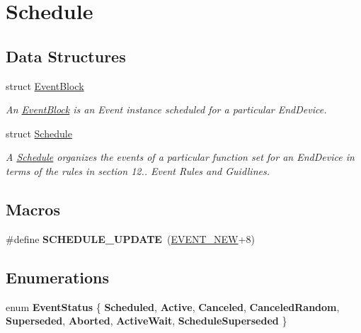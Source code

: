 \hypertarget{group__schedule}{}\section{Schedule}
\label{group__schedule}
\subsection*{Data Structures}
\begin{DoxyCompactItemize}
\item 
struct \hyperlink{structEventBlock}{Event\+Block}
\begin{DoxyCompactList}\small\item\em An \hyperlink{structEventBlock}{Event\+Block} is an Event instance scheduled for a particular End\+Device. \end{DoxyCompactList}\item 
struct \hyperlink{structSchedule}{Schedule}
\begin{DoxyCompactList}\small\item\em A \hyperlink{structSchedule}{Schedule} organizes the events of a particular function set for an End\+Device in terms of the rules in section 12.. Event Rules and Guidlines. \end{DoxyCompactList}\end{DoxyCompactItemize}
\subsection*{Macros}
\begin{DoxyCompactItemize}
\item 
\mbox{\label{group__schedule_ga78a859df05d86016268b99c2d6bbb5ed}} 
\#define {\bfseries S\+C\+H\+E\+D\+U\+L\+E\+\_\+\+U\+P\+D\+A\+TE}~(\hyperlink{group__event_gga2628ea8d12e8b2563c32f05dc7fff6faa747b63b45296ad40109256f1a3c93bb7}{E\+V\+E\+N\+T\+\_\+\+N\+EW}+8)
\end{DoxyCompactItemize}
\subsection*{Enumerations}
\begin{DoxyCompactItemize}
\item 
\mbox{\label{group__schedule_gac03f53915dd13820e0dfd3b3c93bed17}} 
enum {\bfseries Event\+Status} \{ \newline
{\bfseries Scheduled}, 
\newline
{\bfseries Active}, 
\newline
{\bfseries Canceled}, 
\newline
{\bfseries Canceled\+Random}, 
\newline
{\bfseries Superseded}, 
\newline
{\bfseries Aborted}, 
\newline
{\bfseries Active\+Wait}, 
\newline
{\bfseries Schedule\+Superseded}
 \}
\end{DoxyCompactItemize}
